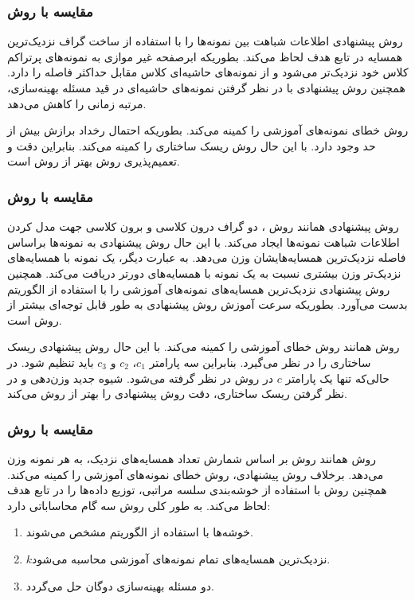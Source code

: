 \subsubsection{مقایسه با روش }\label{sec:4:6:2:1}
روش پیشنهادی  اطلاعات شباهت بین نمونه‌ها را با استفاده از ساخت گراف نزدیک‌ترین همسایه در تابع هدف لحاظ می‌کند. بطوریکه ابرصفحه غیر موازی به نمونه‌های پرتراکم کلاس خود نزدیک‌تر می‌شود و از نمونه‌های حاشیه‌ای کلاس مقابل حداکثر فاصله را دارد. همچنین روش پیشنهادی با در نظر گرفتن نمونه‌های حاشیه‌ای در قید مسئله بهینه‌سازی، مرتبه زمانی را کاهش می‌دهد.

روش  خطای نمونه‌های آموزشی را کمینه می‌کند. بطوریکه احتمال رخداد برازش بیش از حد وجود دارد. با این حال روش  ریسک ساختاری را کمینه می‌کند. بنابراین دقت و تعمیم‌پذیری روش  بهتر از روش  است.

\subsubsection{مقایسه با روش }\label{sec:4:6:2:2}
روش پیشنهادی همانند روش ، دو گراف درون کلاسی و برون کلاسی جهت مدل کردن اطلاعات شباهت نمونه‌ها ایجاد می‌کند. با این حال روش پیشنهادی به نمونه‌ها براساس فاصله نزدیک‌ترین همسایه‌هایشان وزن می‌دهد. به عبارت دیگر، یک نمونه با همسایه‌های نزدیک‌تر وزن بیشتری نسبت به یک نمونه با همسایه‌های دورتر دریافت می‌کند. همچنین روش پیشنهادی نزدیک‌ترین همسایه‌های نمونه‌های آموزشی را با استفاده از الگوریتم  بدست می‌آورد. بطوریکه سرعت آموزش روش پیشنهادی به طور قابل توجه‌ای بیشتر از روش  است.

روش  همانند روش  خطای آموزشی را کمینه می‌کند. با این حال روش پیشنهادی ریسک ساختاری را در نظر می‌گیرد. بنابراین سه پارامتر  $c_{1}$،  $c_{2}$ و  $c_{3}$ باید تنظیم شود. در حالی‌که تنها یک پارامتر $c$ در روش  در نظر گرفته می‌شود. شیوه جدید وزن‌دهی و در نظر گرفتن ریسک ساختاری، دقت روش پیشنهادی را بهتر از روش  می‌کند.

\subsubsection{مقایسه با روش }\label{sec:4:6:2:3}
روش  همانند روش  بر اساس شمارش تعداد همسایه‌های نزدیک، به هر نمونه وزن می‌دهد. برخلاف روش پیشنهادی، روش  خطای نمونه‌های آموزشی را کمینه می‌کند. همچنین روش  با استفاده از خوشه‌بندی سلسه مراتبی، توزیع داده‌ها را در تابع هدف لحاظ می‌کند. به طور کلی روش  سه گام محاساباتی دارد:
\begin{enumerate}
	\item خوشه‌ها با استفاده از الگوریتم  مشخص می‌شوند.
	\item $k$نزدیک‌ترین همسایه‌های تمام نمونه‌های آموزشی محاسبه می‌شود.
	\item دو مسئله بهینه‌سازی دوگان حل می‌گردد.
\end{enumerate}

